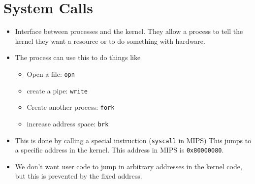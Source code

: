 \documentclass[12pt]{article}
\begin{document}
\section{System Calls}

\begin{itemize}
    \item Interface between processes and the kernel. They allow a process to
        tell the kernel they want a resource or to do something with hardware.
    \item The process can use this to do things like
        \begin{itemize}
            \item Open a file: \texttt{opn}
            \item create a pipe: \texttt{write}
            \item Create another process: \texttt{fork}
            \item increase address space: \texttt{brk}
        \end{itemize}
    \item This is done by calling a special instruction (\texttt{syscall} in
        MIPS) This jumps to a specific address in the kernel. This address in
        MIPS is \texttt{0x80000080}.
    \item We don't want user code to jump in arbitrary addresses in the kernel
        code, but this is prevented by the fixed address.
\end{itemize}
\end{document}

